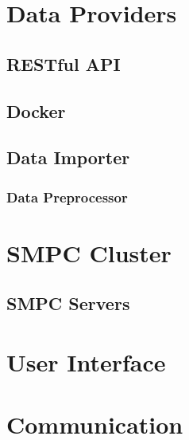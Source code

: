 




\section{Data Providers}\label{s:impl-data-providers}

\subsection{RESTful API}\label{ss:data-providers-restful-api}


\subsection{Docker}\label{ss:data-providers-docker}

\subsection{Data Importer}\label{ss:data-providers-importer}

\subsubsection{Data Preprocessor}\label{sss:data-providers-preprocessor}



\section{SMPC Cluster}\label{s:impl-smpc-cluster}

\subsection{SMPC Servers}\label{ss:smpc-cluster-servers}



\section{User Interface}\label{s:impl-ui}



\section{Communication}\label{s:impl-communication}

